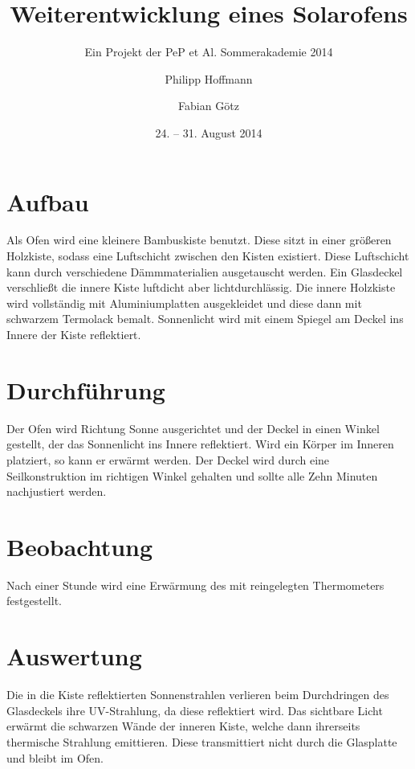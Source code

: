 

\title{Weiterentwicklung eines Solarofens}
\subtitle{Ein Projekt der PeP et Al. Sommerakademie 2014}
\date{24. -- 31. August 2014}

\author{Philipp Hoffmann \and Fabian Götz}



\maketitle
\tableofcontents

\section{Aufbau}

Als Ofen wird eine kleinere Bambuskiste benutzt. Diese sitzt in einer größeren Holzkiste, sodass eine Luftschicht zwischen den Kisten existiert. Diese Luftschicht kann durch verschiedene Dämmmaterialien ausgetauscht werden. Ein Glasdeckel verschließt die innere Kiste luftdicht aber lichtdurchlässig. Die innere Holzkiste wird vollständig mit Aluminiumplatten ausgekleidet und diese dann mit schwarzem Termolack bemalt. Sonnenlicht wird mit einem Spiegel am Deckel ins Innere der Kiste reflektiert. 

\section{Durchführung}

Der Ofen wird Richtung Sonne ausgerichtet und der Deckel in einen Winkel gestellt, der das Sonnenlicht ins Innere reflektiert. Wird ein Körper im Inneren platziert, so kann er erwärmt werden. 
Der Deckel wird durch eine Seilkonstruktion im richtigen Winkel gehalten und sollte alle Zehn Minuten nachjustiert werden.

\section{Beobachtung}

Nach einer Stunde wird eine Erwärmung des mit reingelegten Thermometers festgestellt. 

\section{Auswertung}

Die in die Kiste reflektierten Sonnenstrahlen verlieren beim Durchdringen des Glasdeckels ihre UV-Strahlung, da diese reflektiert wird. Das sichtbare Licht erwärmt die schwarzen Wände der inneren Kiste, welche dann ihrerseits thermische Strahlung emittieren. Diese transmittiert nicht durch die Glasplatte und bleibt im Ofen.

